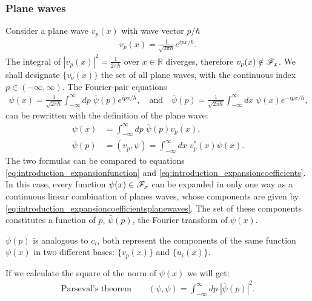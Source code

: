 \subsubsection{Plane waves}
Consider a plane wave $v_p(x)$ with wave vector $p/\hbar$
\begin{align}
    v_p(x)=\frac{1}{\sqrt{2\pi\hbar}}e^{ipx/\hbar}.
\end{align}
The integral of $|v_p(x)|^2=\frac{1}{2\pi\hbar}$ over $x\in\mathbb{R}$ diverges, therefore $v_p(x)\notin\mathscr{F}_x$. We shall designate $\{v_o(x)\}$ the set of all plane waves, 
with the continuous index $p\in(-\infty,\infty)$. The Fourier-pair equations 
\begin{align*}
    \psi(x)=\frac{1}{\sqrt{2\pi\hbar}}\int_{-\infty}^\infty dp\;\bar{\psi}(p)e^{ipx/\hbar},\quad\text{and}\quad\bar{\psi}(p)=\frac{1}{\sqrt{2\pi\hbar}}\int_{-\infty}^\infty dx\;\psi(x)e^{-ipx/\hbar},
\end{align*}
can be rewritten with the definition of the plane wave:
\begin{align}
    \psi(x)&=\int_{-\infty}^\infty dp\;\bar{\psi}(p)v_p(x),\label{eq:introduction_expansionfunctionplanewaves}\\
    \bar{\psi}(p)&=(v_p,\psi)=\int_{-\infty}^\infty dx\;v_p^*(x)\psi(x)\label{eq:introduction_expansioncoefficientsplanewaves}.
\end{align}
The two formulas can be compared to equations \eqref{eq:introduction_expansionfunction} and \eqref{eq:introduction_expansioncoefficients}. In this case, every function $\psi(x)\in\mathscr{F}_x$ 
can be expanded in only one way as a continuous linear combination of planes waves, whose components are given by \eqref{eq:introduction_expansioncoefficientsplanewaves}. The set of 
these components constitutes a function of $p$, $\bar{\psi}(p)$, the Fourier transform of $\psi(x)$.

\begin{emphasizer}
    $\bar{\psi}(p)$ is analogous to $c_i$, both represent the components of the same function $\psi(x)$ in two different bases: $\{v_p(x)\}$ and $\{u_i(x)\}$.
\end{emphasizer}

If we calculate the square of the norm of $\psi(x)$ we will get:
\begin{align}
    \text{Parseval's theorem}\qquad(\psi,\psi)=\int_{-\infty}^\infty dp\;|\bar{\psi}(p)|^2.
\end{align}

